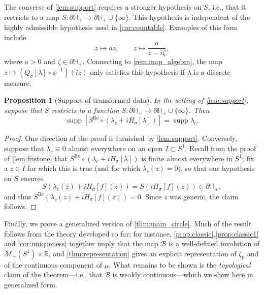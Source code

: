 \documentclass{cams-l} %
\newcommand{\RR}{\mathbb R}
\newcommand{\HH}{\mathbb H}
\newcommand{\cM}{\mathcal M}
\newcommand{\cB}{\mathcal B}
\newcommand{\op}{\operatorname}
\newcommand{\supp}{\operatorname{supp}}
\renewcommand{\Re}{\op{Re}}
\newtheorem{proposition}[theorem]{Proposition}
\theoremstyle{definition}
\theoremstyle{remark}
\numberwithin{equation}{section}
\begin{document}
The converse of \cref{lem:support} requires a stronger hypothesis on $S$, i.e., that it restricts to a map $S:\partial \HH_+\to\partial \HH_+\cup\{\infty\}$. This hypothesis is independent of the highly admissible hypothesis used in \cref{cor:countable}. Examples of this form include
\[z\mapsto az,\qquad z\mapsto\frac{a}{z-i\zeta},\]
where $a>0$ and $\zeta\in\partial \HH_+$. Connecting to \cref{rem:map_algebra}, the map $z\mapsto (Q_\sigma[\lambda]\circ\phi^{-1})(iz)$ only satisfies this hypothesis if $\lambda$ is a discrete measure.
\begin{proposition}[Support of transformed data]\label{prop:support}
    In the setting of \cref{lem:support}, suppose that $S$ restricts to a function $S:\partial \HH_+\to\partial \HH_+\cup\{\infty\}$. Then
    \[\supp \left[S^{\Re}\circ(\lambda_c+iH_\sigma[\lambda])\right] =\supp \lambda_c.\]
\end{proposition}
\begin{proof}
    One direction of the proof is furnished by \cref{lem:support}. Conversely, suppose that $\lambda_c\equiv 0$ almost everywhere on an open $I\subset S^1$. Recall from the proof of \cref{lem:firstone} that $S^{\Re}\circ(\lambda_c+iH_\sigma[\lambda])$ is finite almost everywhere in $S^1$; fix a $z\in I$ for which this is true (and for which $\lambda_c(z)=0$), so that our hypothesis on $S$ ensures 
    \[S(\lambda_c(z) + iH_\sigma[f](z)) = S(iH_\sigma[f](z)) \in \partial \HH_+,\]
    and thus $S^{\Re}(\lambda_c(z) + iH_\sigma[f](z)) = 0$. Since $z$ was generic, the claim follows.
\end{proof}

Finally, we prove a generalized version of \cref{thm:main_circle}. Much of the result follows from the theory developed so far; for instance, \cref{prop:classic}.\ref{prop:classic1} and \cref{cor:uniqueness} together imply that the map $\cB$ is a well-defined involution of $\cM_+(S^1)\times\RR$, and \cref{thm:representation} gives an explicit representation of $\zeta_0$ and of the continuous component of $\mu$. What remains to be shown is the \emph{topological} claim of the theorem---i.e., that $\cB$ is weakly continuous---which we show here in generalized form.
\end{document}
